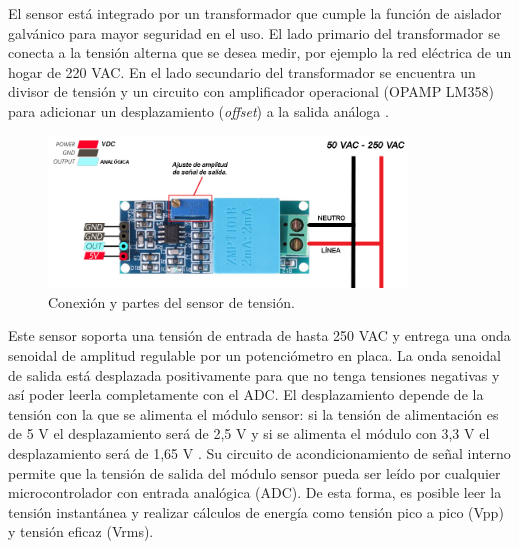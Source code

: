 El sensor está integrado por un transformador que cumple la función de aislador galvánico para mayor seguridad en el uso. El lado primario del transformador se conecta a la tensión alterna que se desea medir, por ejemplo la red eléctrica de un hogar de 220 VAC. En el lado secundario del transformador se encuentra un divisor de tensión y un circuito con amplificador operacional (OPAMP LM358) para adicionar un desplazamiento (\emph{offset}) a la salida análoga \citep{WEBSITE:22}. 

\begin{figure}[htpb]
\centering 
\includegraphics[width=0.85\textwidth]{./Figures/sensortension.png}
\caption{Conexión y partes del sensor de tensión.}
\label{fig:sensortension}
\end{figure}


Este sensor soporta una tensión de entrada de hasta 250 VAC y entrega una onda senoidal de amplitud regulable por un potenciómetro en placa. La onda senoidal de salida está desplazada positivamente para que no tenga tensiones negativas y así poder leerla completamente con el ADC. El desplazamiento depende de la tensión con la que se alimenta el módulo sensor: si la tensión de alimentación es de 5 V el desplazamiento será de 2,5 V y si se alimenta el módulo con 3,3 V el desplazamiento será de 1,65 V \citep{WEBSITE:23}. Su circuito de acondicionamiento de señal interno permite que la tensión de salida del módulo sensor pueda ser leído por cualquier microcontrolador con entrada analógica (ADC). De esta forma, es posible leer la tensión instantánea y realizar cálculos de energía como tensión pico a pico (Vpp) y tensión eficaz (Vrms). 




